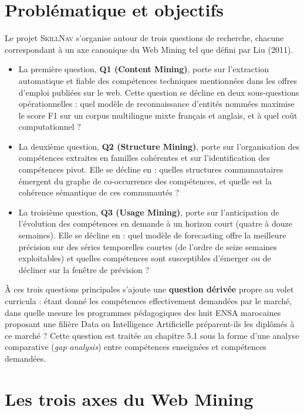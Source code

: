 \documentclass[11pt,a4paper,openany]{report}
\newcommand{\skillnav}{\textsc{SkillNav}\xspace}
\begin{document}
\section{Probl\'ematique et objectifs}

Le projet \skillnav s'organise autour de trois questions de recherche, chacune correspondant \`a un axe canonique du Web Mining tel que d\'efini par Liu (2011).

\begin{itemize}
  \item La premi\`ere question, \textbf{Q1 (Content Mining)}, porte sur l'extraction automatique et fiable des comp\'etences techniques mentionn\'ees dans les offres d'emploi publi\'ees sur le web. Cette question se d\'ecline en deux sous-questions op\'erationnelles : quel mod\`ele de reconnaissance d'entit\'es nomm\'ees maximise le score F1 sur un corpus multilingue mixte fran\c{c}ais et anglais, et \`a quel co\^ut computationnel ?
  \item La deuxi\`eme question, \textbf{Q2 (Structure Mining)}, porte sur l'organisation des comp\'etences extraites en familles coh\'erentes et sur l'identification des comp\'etences pivot. Elle se d\'ecline en : quelles structures communautaires \'emergent du graphe de co-occurrence des comp\'etences, et quelle est la coh\'erence s\'emantique de ces communaut\'es ?
  \item La troisi\`eme question, \textbf{Q3 (Usage Mining)}, porte sur l'anticipation de l'\'evolution des comp\'etences en demande \`a un horizon court (quatre \`a douze semaines). Elle se d\'ecline en : quel mod\`ele de forecasting offre la meilleure pr\'ecision sur des s\'eries temporelles courtes (de l'ordre de seize semaines exploitables) et quelles comp\'etences sont susceptibles d'\'emerger ou de d\'ecliner sur la fen\^etre de pr\'evision ?
\end{itemize}

\`A ces trois questions principales s'ajoute une \textbf{question d\'eriv\'ee} propre au volet curricula : \'etant donn\'e les comp\'etences effectivement demand\'ees par le march\'e, dans quelle mesure les programmes p\'edagogiques des huit ENSA marocaines proposant une fili\`ere Data ou Intelligence Artificielle pr\'eparent-ils les dipl\^om\'es \`a ce march\'e ? Cette question est trait\'ee au chapitre 5.1 sous la forme d'une analyse comparative (\emph{gap analysis}) entre comp\'etences enseign\'ees et comp\'etences demand\'ees.

\section{Les trois axes du Web Mining}
\end{document}
